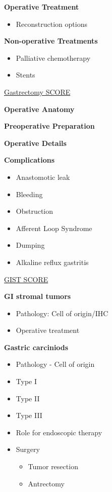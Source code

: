 \documentclass[
]{book}
\providecommand{\tightlist}{%
  \setlength{\itemsep}{0pt}\setlength{\parskip}{0pt}}
\begin{document}
\textbf{Operative Treatment}

\begin{itemize}
\tightlist
\item
  Reconstruction options
\end{itemize}

\textbf{Non-operative Treatments}

\begin{itemize}
\tightlist
\item
  Palliative chemotherapy
\item
  Stents
\end{itemize}

\href{http://portal.surgicalcore.org/modulecontent.aspx?id=146287}{Gastrectomy SCORE}

\textbf{Operative Anatomy}

\textbf{Preoperative Preparation}

\textbf{Operative Details}

\textbf{Complications}

\begin{itemize}
\tightlist
\item
  Anastomotic leak
\item
  Bleeding
\item
  Obstruction
\item
  Afferent Loop Syndrome
\item
  Dumping
\item
  Alkaline reflux gastritis
\end{itemize}

\href{http://portal.surgicalcore.org/modulecontent.aspx?id=136240}{GIST SCORE}

\textbf{GI stromal tumors}

\begin{itemize}
\tightlist
\item
  Pathology: Cell of origin/IHC
\item
  Operative treatment
\end{itemize}

\textbf{Gastric carciniods}

\begin{itemize}
\tightlist
\item
  Pathology - Cell of origin
\item
  Type I
\item
  Type II
\item
  Type III
\item
  Role for endoscopic therapy
\item
  Surgery

  \begin{itemize}
  \tightlist
  \item
    Tumor resection
  \item
    Antrectomy
  \end{itemize}
\end{itemize}
\end{document}
